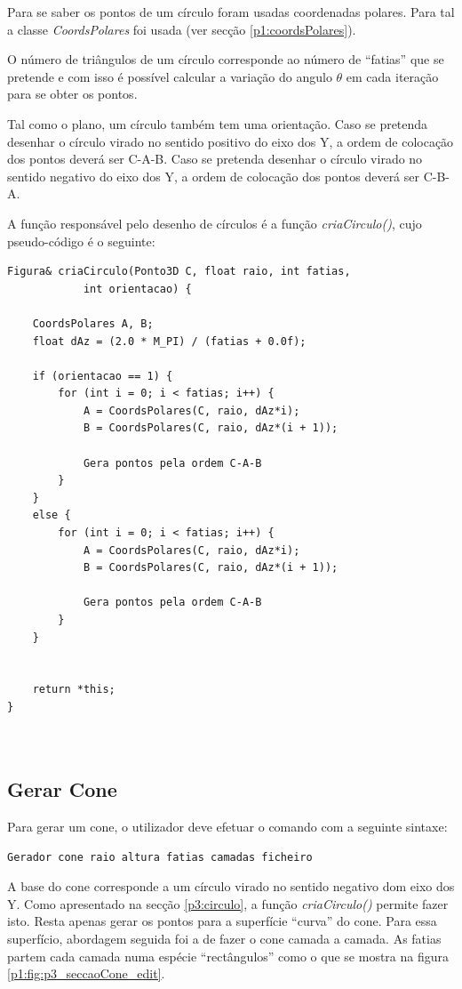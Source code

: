 Para se saber os pontos de um círculo foram usadas coordenadas polares. Para tal a classe \textit{CoordsPolares} foi usada (ver secção \ref{p1:coordsPolares}).

O número de triângulos de um círculo corresponde ao número de ``fatias'' que se pretende e com isso é possível calcular a variação do angulo $\theta$ em cada iteração para se obter os pontos.

Tal como o plano, um círculo também tem uma orientação. Caso se pretenda desenhar o círculo virado no sentido positivo do eixo dos Y, a ordem de colocação dos pontos deverá ser C-A-B. Caso se pretenda desenhar o círculo virado no sentido negativo do eixo dos Y, a ordem de colocação dos pontos deverá ser C-B-A.

A função responsável pelo desenho de círculos é a função \textit{criaCirculo()}, cujo pseudo-código é o seguinte:

\begin{Verbatim}
Figura& criaCirculo(Ponto3D C, float raio, int fatias, 
			int orientacao) {

	CoordsPolares A, B;
	float dAz = (2.0 * M_PI) / (fatias + 0.0f);
	
	if (orientacao == 1) {
		for (int i = 0; i < fatias; i++) {
			A = CoordsPolares(C, raio, dAz*i);
			B = CoordsPolares(C, raio, dAz*(i + 1));
			
			Gera pontos pela ordem C-A-B
		}
	}
	else {
		for (int i = 0; i < fatias; i++) {
			A = CoordsPolares(C, raio, dAz*i);
			B = CoordsPolares(C, raio, dAz*(i + 1));
			
			Gera pontos pela ordem C-A-B
		}
	}
	
	
	return *this;
}



\end{Verbatim}

\newpage
\subsection{Gerar Cone}

Para gerar um cone, o utilizador deve efetuar o comando com a seguinte sintaxe:

\begin{Verbatim}
Gerador cone raio altura fatias camadas ficheiro
\end{Verbatim}

A base do cone corresponde a um círculo virado no sentido negativo dom eixo dos Y. Como apresentado na secção \ref{p3:circulo}, a função \textit{criaCirculo()} permite fazer isto. Resta apenas gerar os pontos para a superfície ``curva'' do cone. Para essa superfício, abordagem seguida foi a de fazer o cone camada a camada. As fatias partem cada camada numa espécie ``rectângulos'' como o que se mostra na figura \ref{p1:fig:p3_seccaoCone_edit}.


